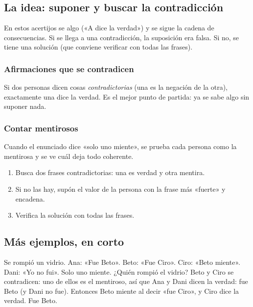 \bitacora


\subsection{La idea: suponer y buscar la contradicción}
En estos acertijos se  algo («A dice la verdad») y se sigue la cadena de consecuencias. Si se llega a una
contradicción, la suposición era falsa. Si no, se tiene una solución (que conviene verificar con todas las frases).

\subsubsection{Afirmaciones que se contradicen}
Si dos personas dicen cosas \emph{contradictorias} (una es la negación de la otra), exactamente una dice la verdad. Es el
mejor punto de partida: ya se sabe algo sin suponer nada.

\subsubsection{Contar mentirosos}
Cuando el enunciado dice «solo uno miente», se prueba cada persona como la mentirosa y se ve cuál deja todo coherente.

\begin{regla}
\begin{enumerate}
  \item Busca dos frases contradictorias: una es verdad y otra mentira.
  \item Si no las hay, supón el valor de la persona con la frase más «fuerte» y encadena.
  \item Verifica la solución con todas las frases.
\end{enumerate}
\end{regla}

\subsection{Más ejemplos, en corto}
\begin{ejemplo}
Se rompió un vidrio. Ana: «Fue Beto». Beto: «Fue Ciro». Ciro: «Beto miente». Dani: «Yo no fui». Solo uno miente. ¿Quién
rompió el vidrio?
\solucion Beto y Ciro se contradicen: uno de ellos es el mentiroso, así que Ana y Dani dicen la verdad: fue Beto (y Dani
no fue). Entonces Beto miente al decir «fue Ciro», y Ciro dice la verdad. Fue Beto.
\end{ejemplo}


